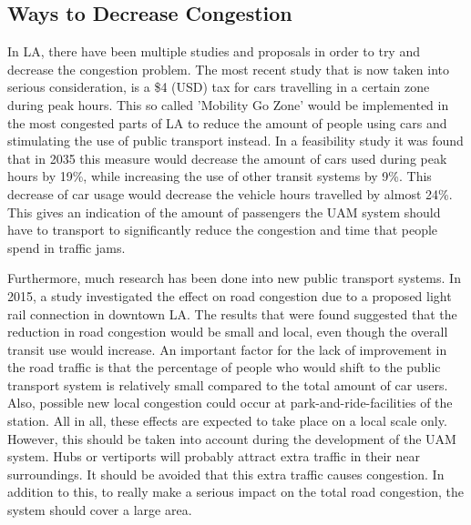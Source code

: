 
\subsection{Ways to Decrease Congestion}
\label{decrease}
In LA, there have been multiple studies and proposals in order to try and decrease the congestion problem. The most recent study that is now taken into serious consideration, is a \$4 (USD) tax for cars travelling in a certain zone during peak hours. This so called 'Mobility Go Zone' \cite{mobilitygo} would be implemented in the most congested parts of LA to reduce the amount of people using cars and stimulating the use of public transport instead. In a feasibility study it was found that in 2035 this measure would decrease the amount of cars used during peak hours by 19\%, while increasing the use of other transit systems by 9\%. This decrease of car usage would decrease the vehicle hours travelled by almost 24\%. This gives an indication of the amount of passengers the UAM system should have to transport to significantly reduce the congestion and time that people spend in traffic jams. 

Furthermore, much research has been done into new public transport systems. In 2015, a study \cite{lightrail} investigated the effect on road congestion due to a proposed light rail connection in downtown LA. The results that were found suggested that the reduction in road congestion would be small and local, even though the overall transit use would increase. An important factor for the lack of improvement in the road traffic is that the percentage of people who would shift to the public transport system is relatively small compared to the total amount of car users. Also, possible new local congestion could occur at park-and-ride-facilities of the station. All in all, these effects are expected to take place on a local scale only. However, this should be taken into account during the development of the UAM system. Hubs or vertiports will probably attract extra traffic in their near surroundings. It should be avoided that this extra traffic causes congestion. In addition to this, to really make a serious impact on the total road congestion, the system should cover a large area. 

